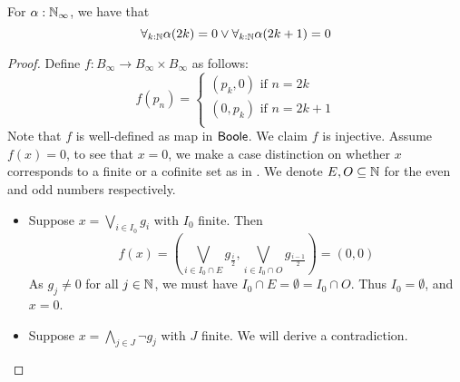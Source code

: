 \begin{theorem}\label{LLPO}
  For $\alpha:\mathbb{N}_\infty$, 
  we have that 
  \begin{equation}\label{eqnLLPO}
    \forall_{k:\mathbb{N}} \alpha(2k) = 0  \vee \forall_{k:\mathbb{N}} \alpha(2k+1) = 0
  \end{equation}
\end{theorem}
\begin{proof}
%
  Define $f:B_\infty \to B_\infty \times B_\infty$ as follows:
  \begin{equation}\label{eqnLLPOProofMap}
    f(p_n) =\begin{cases}
      (p_k,0) \text{ if } n = 2k\\
      (0,p_k) \text{ if } n = 2k+1\\
    \end{cases}
  \end{equation}
  Note that $f$ is well-defined as map in $\mathsf{Boole}$. 
  We claim $f$ is injective. Assume $f(x) = 0$, 
  to see that $x=0$, we make a case distinction on whether $x$ corresponds to a finite or a cofinite set as in .
%
  We denote $E,O\subseteq \mathbb{N}$ for the even and odd numbers respectively. 
  \begin{itemize}
    \item Suppose 
      $x = \bigvee_{i\in I_0} g_i$ with $I_0$ finite. 
      Then 
      $$f(x) = (\bigvee_{i\in I_0 \cap E } g_{\frac i2} , \bigvee_{i\in I_0 \cap O } g_{\frac {i-1}2} ) = (0,0)$$
      As $g_j\neq 0$ for all $j\in\mathbb{N}$, we must have $I_0 \cap E = \emptyset = I_0 \cap O$. 
      Thus $I_0= \emptyset$, and $x = 0$. 
    \item Suppose 
      $x = \bigwedge_{j\in J} \neg g_j$ with $J$ finite. %
      We will derive a contradiction. %

\end{itemize}
\end{proof}
